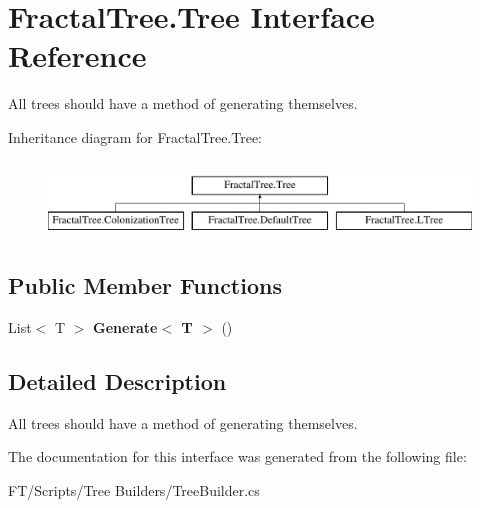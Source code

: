 \hypertarget{interface_fractal_tree_1_1_tree}{}\section{Fractal\+Tree.\+Tree Interface Reference}
\label{interface_fractal_tree_1_1_tree}


All trees should have a method of generating themselves.  


Inheritance diagram for Fractal\+Tree.\+Tree\+:\begin{figure}[H]
\begin{center}
\leavevmode
\includegraphics[height=2.000000cm]{interface_fractal_tree_1_1_tree}
\end{center}
\end{figure}
\subsection*{Public Member Functions}
\begin{DoxyCompactItemize}
\item 
\mbox{\label{interface_fractal_tree_1_1_tree_a63c5353759447db5034d7ee1c83fbd78}} 
List$<$ T $>$ {\bfseries Generate$<$ T $>$} ()
\end{DoxyCompactItemize}


\subsection{Detailed Description}
All trees should have a method of generating themselves. 



The documentation for this interface was generated from the following file\+:\begin{DoxyCompactItemize}
\item 
F\+T/\+Scripts/\+Tree Builders/Tree\+Builder.\+cs\end{DoxyCompactItemize}
